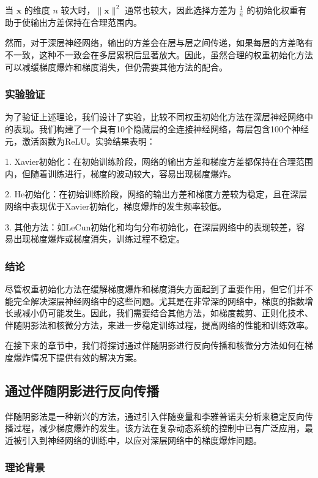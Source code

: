 \documentclass[12pt,a4paper]{amsart}
\begin{document}
当 \(\mathbf{x}\) 的维度 \( n \) 较大时，\(\|\mathbf{x}\|^2\) 通常也较大，因此选择方差为 \(\frac{1}{n}\) 的初始化权重有助于使输出方差保持在合理范围内。

然而，对于深层神经网络，输出的方差会在层与层之间传递，如果每层的方差略有不一致，这种不一致会在多层累积后显著放大。因此，虽然合理的权重初始化方法可以减缓梯度爆炸和梯度消失，但仍需要其他方法的配合。

\subsubsection{实验验证}

为了验证上述理论，我们设计了实验，比较不同权重初始化方法在深层神经网络中的表现。我们构建了一个具有10个隐藏层的全连接神经网络，每层包含100个神经元，激活函数为ReLU。实验结果表明：

1. Xavier初始化：在初始训练阶段，网络的输出方差和梯度方差都保持在合理范围内，但随着训练进行，梯度的波动较大，容易出现梯度爆炸。
   
2. He初始化：在初始训练阶段，网络的输出方差和梯度方差较为稳定，且在深层网络中表现优于Xavier初始化，梯度爆炸的发生频率较低。

3. 其他方法：如LeCun初始化和均匀分布初始化，在深层网络中的表现较差，容易出现梯度爆炸或梯度消失，训练过程不稳定。

\subsubsection{结论}

尽管权重初始化方法在缓解梯度爆炸和梯度消失方面起到了重要作用，但它们并不能完全解决深层神经网络中的这些问题。尤其是在非常深的网络中，梯度的指数增长或减小仍可能发生。因此，我们需要结合其他方法，如梯度裁剪、正则化技术、伴随阴影法和核微分方法，来进一步稳定训练过程，提高网络的性能和训练效率。

在接下来的章节中，我们将探讨通过伴随阴影进行反向传播和核微分方法如何在梯度爆炸情况下提供有效的解决方案。

\subsection{通过伴随阴影进行反向传播}

伴随阴影法是一种新兴的方法，通过引入伴随变量和李雅普诺夫分析来稳定反向传播过程，减少梯度爆炸的发生。该方法在复杂动态系统的控制中已有广泛应用，最近被引入到神经网络的训练中，以应对深层网络中的梯度爆炸问题。

\subsubsection{理论背景}
\end{document}
